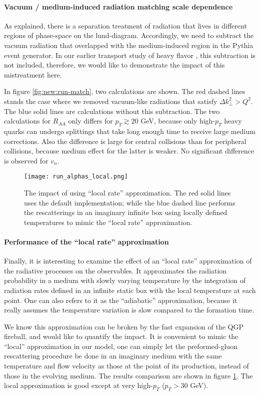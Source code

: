 \paragraph{Vacuum / medium-induced radiation matching scale dependence}
As explained, there is a separation treatment of radiation that lives in different regions of phase-space on the lund-diagram.
Accordingly, we need to subtract the vacuum radiation that overlapped with the medium-induced region in the Pythia event generator.
In our earlier transport study of heavy flavor \cite{Ke:2018tsh}, this subtraction is not included, therefore, we would like to demonstrate the impact of this mistreatment here.

In figure \ref{fig:new:run-match}, two calculations are shown. 
The red dashed lines stands the case where we removed vacuum-like radiations that satisfy $\Delta k_\perp^2 > Q^2$.
The blue solid lines are calculations without this subtraction.
The two calculations for $R_{AA}$ only differs for $p_T\gtrsim 20$ GeV, because only high-$p_T$ heavy quarks can undergo splittings that take long enough time to receive large medium corrections.
Also the difference is large for central collisions than for peripheral collisions, because medium effect for the latter is weaker.
No significant difference is observed for $v_n$.

\begin{figure}
\centering
\texttt{[image: run\_alphas\_local.png]}
\caption{The impact of using ``local rate'' approximation. The red solid lines uses the default implementation; while the blue dashed line performs the rescatterings in an imaginary infinite box using locally defined temperatures to mimic the ``local rate'' approximation.}
\label{fig:new:run-local}
\end{figure}

\paragraph{Performance of the ``local rate'' approximation}
Finally, it is interesting to examine the effect of an ``local rate'' approximation of the radiative processes on the observables.
It approximates the radiation probability in a medium with slowly varying temperature by the integration of radiation rates defined in an infinite static box with the local temperature at each point.
One can also refers to it as the ``adiabatic'' approximation, because it really assumes the temperature variation is slow compared to the formation  time.

We know this approximation can be broken by the fast expansion of the QGP fireball, and would like to quantify the impact.
It is convenient to mimic the ``local'' approximation in our model, one can simply let the preformed-gluon rescattering procedure be done in an imaginary medium with the same temperature and flow velocity as those at the point of its production, instead of those in the evolving medium.
The results comparison are shown in figure \ref{fig:new:run-local}.
The local approximation is good except at very high-$p_T$ ($p_T > 30$ GeV).

